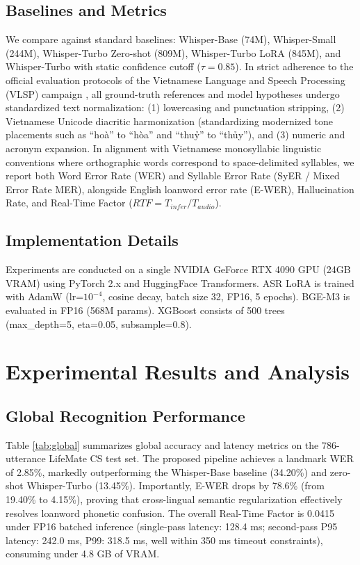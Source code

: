 \documentclass[9pt, conference, a4paper, compsocconf]{IEEEtran}
\begin{document}
\subsection{Baselines and Metrics}
We compare against standard baselines: Whisper-Base (74M), Whisper-Small (244M), Whisper-Turbo Zero-shot (809M), Whisper-Turbo LoRA (845M), and Whisper-Turbo with static confidence cutoff ($\tau=0.85$). In strict adherence to the official evaluation protocols of the Vietnamese Language and Speech Processing (VLSP) campaign \cite{vlsp2022sharedtask}, all ground-truth references and model hypotheses undergo standardized text normalization: (1) lowercasing and punctuation stripping, (2) Vietnamese Unicode diacritic harmonization (standardizing modernized tone placements such as ``hoà'' to ``hòa'' and ``thuỷ'' to ``thủy''), and (3) numeric and acronym expansion. In alignment with Vietnamese monosyllabic linguistic conventions where orthographic words correspond to space-delimited syllables, we report both Word Error Rate (WER) and Syllable Error Rate (SyER / Mixed Error Rate MER), alongside English loanword error rate (E-WER), Hallucination Rate, and Real-Time Factor ($RTF = T_{infer} / T_{audio}$).

\subsection{Implementation Details}
Experiments are conducted on a single NVIDIA GeForce RTX 4090 GPU (24GB VRAM) using PyTorch 2.x and HuggingFace Transformers. ASR LoRA is trained with AdamW (lr=$10^{-4}$, cosine decay, batch size 32, FP16, 5 epochs). BGE-M3 is evaluated in FP16 (568M params). XGBoost consists of 500 trees (max\_depth=5, eta=0.05, subsample=0.8).

\section{Experimental Results and Analysis}

\subsection{Global Recognition Performance}
Table \ref{tab:global} summarizes global accuracy and latency metrics on the 786-utterance LifeMate CS test set. The proposed pipeline achieves a landmark WER of 2.85\%, markedly outperforming the Whisper-Base baseline (34.20\%) and zero-shot Whisper-Turbo (13.45\%). Importantly, E-WER drops by 78.6\% (from 19.40\% to 4.15\%), proving that cross-lingual semantic regularization effectively resolves loanword phonetic confusion. The overall Real-Time Factor is 0.0415 under FP16 batched inference (single-pass latency: 128.4 ms; second-pass P95 latency: 242.0 ms, P99: 318.5 ms, well within 350 ms timeout constraints), consuming under 4.8 GB of VRAM.
\end{document}
